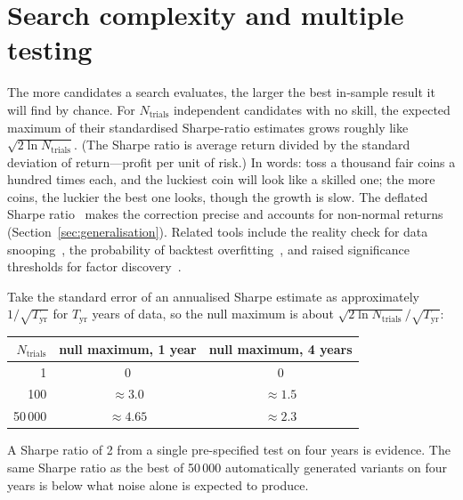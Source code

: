 \section{Search complexity and multiple testing}
\label{sec:search}

The more candidates a search evaluates, the larger the best in-sample result it will find by
chance. For $N_{\text{trials}}$ independent candidates with no skill, the expected maximum of
their standardised Sharpe-ratio estimates grows roughly like $\sqrt{2 \ln N_{\text{trials}}}$. (The Sharpe ratio is
average return divided by the standard deviation of return---profit per unit of risk.) In words:
toss a thousand fair coins a hundred times each, and the luckiest coin will look like a skilled
one; the more coins, the luckier the best one looks, though the growth is slow. The deflated Sharpe
ratio~\citep{bailey2014} makes the correction precise and accounts for non-normal returns
(Section~\ref{sec:generalisation}). Related tools include the reality check for data
snooping~\citep{white2000}, the probability of backtest overfitting~\citep{bailey2014pbo}, and
raised significance thresholds for factor discovery~\citep{harvey2016}.

\begin{example}
Take the standard error of an annualised Sharpe estimate as approximately $1/\sqrt{T_{\text{yr}}}$ for $T_{\text{yr}}$
years of data, so the null maximum is about $\sqrt{2\ln N_{\text{trials}}}/\sqrt{T_{\text{yr}}}$:
\begin{center}\small
\begin{tabular}{rcc}
\toprule
$N_{\text{trials}}$ & null maximum, 1 year & null maximum, 4 years \\
\midrule
1 & 0 & 0 \\
100 & $\approx 3.0$ & $\approx 1.5$ \\
50\,000 & $\approx 4.65$ & $\approx 2.3$ \\
\bottomrule
\end{tabular}
\end{center}
A Sharpe ratio of 2 from a single pre-specified test on four years is evidence. The same Sharpe
ratio as the best of 50\,000 automatically generated variants on four years is below what noise
alone is expected to produce.
\end{example}

